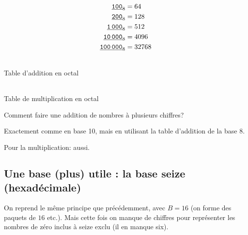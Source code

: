 \begin{minipage}[t]{0.18\linewidth}
  \begin{align*}
\underline{\text{\texttt{100}}}_{8} &= 64\\
\underline{\text{\texttt{200}}}_{8} &= 128\\
\underline{\text{\texttt{1\,000}}}_{8} &= 512\\
\underline{\text{\texttt{10\,000}}}_{8} &= 4096\\
\underline{\text{\texttt{100\,000}}}_{8} &= 32768\\
\end{align*}
\end{minipage}

\begin{minipage}[c]{.48\linewidth}
\begin{center}
  \\
  Table d'addition en octal
\end{center}
\end{minipage} \hfill
\begin{minipage}[c]{.48\linewidth}
\begin{center}
  \\
  Table de multiplication en octal
\end{center}
\end{minipage}

Comment faire une addition de nombres à plusieurs chiffres?

Exactement comme en base 10, mais en utilisant la table d'addition de
la base 8.

Pour la multiplication: aussi.

\subsection{Une base (plus) utile : la base seize (hexadécimale)}

On reprend le même principe que précédemment, avec $B = 16$ (on forme des paquets de $16$ etc.). Mais cette fois on manque de chiffres pour représenter les nombres de zéro inclus à
seize exclu (il en manque six).

